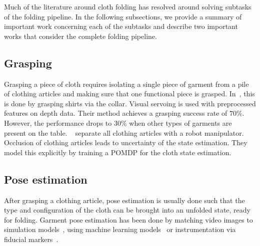 \documentclass[\home/main.tex]{subfiles}
\begin{document}
Much of the literature around cloth folding has resolved around solving subtasks of the folding pipeline. In the following subsections, we provide a summary of important work concerning each of the subtasks and describe two important works that consider the complete folding pipeline.

\subsection{Grasping}
Grasping a piece of cloth requires isolating a single piece of garment from a pile of clothing articles and making sure that one functional piece is grasped. In~\autocite{Ramisa2012}, this is done by grasping shirts via the collar. Visual servoing is used with preprocessed features on depth data. Their method achieves a grasping success rate of $70\%$. However, the performance drops to $30\%$ when other types of garments are present on the table. ~\autocite{Monso2012} separate all clothing articles with a robot manipulator. Occlusion of clothing articles leads to uncertainty of the state estimation. They model this explicitly by training a \acrshort{POMDP} for the cloth state estimation.

\subsection{Pose estimation}
After grasping a clothing article, pose estimation is usually done such that the type and configuration of the cloth can be brought into an unfolded state, ready for folding. Garment pose estimation has been done by matching video images to simulation models~\autocite{Kita2002}, using machine learning models~\autocite{Li2014, li2014volum} or instrumentation via fiducial markers~\autocite{Bersch2011}.
\end{document}
